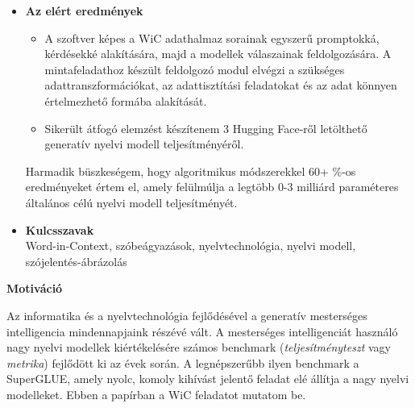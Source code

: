 \documentclass[12pt]{report}
\theoremstyle{definition}
\begin{document}
\begin{itemize}
\begin{itemize}
      \end{itemize}
\item \textbf{Az elért eredmények}
        \\
        \begin{itemize}
            \item A szoftver képes a WiC adathalmaz sorainak egyszerű promptokká, kérdésekké alakítására, majd a modellek válaszainak feldolgozására.
        A mintafeladathoz készült feldolgozó modul elvégzi a szükséges adattranszformációkat, az adattisztítási feladatokat és az adat könnyen értelmezhető formába alakítását.

     \item Sikerült átfogó elemzést készítenem 3 Hugging Face-ről
      letölthető generatív nyelvi modell teljesítményéről.
        \end{itemize}


      Harmadik büszkeségem, hogy algoritmikus módszerekkel 60+ \%-os eredményeket értem el, amely felülmúlja a legtöbb 0-3 milliárd paraméteres általános célú nyelvi modell teljesítményét.

\item \textbf{Kulcsszavak}
        \\
       Word-in-Context, szóbeágyazások, nyelvtechnológia, nyelvi modell, szójelentés-ábrázolás
\end{itemize}

\tableofcontents

\clearpage

{\Large\bf Motiváció }

Az informatika és a nyelvtechnológia fejlődésével a generatív mesterséges intelligencia mindennapjaink részévé vált. A mesterséges intelligenciát használó nagy nyelvi modellek kiértékelésére számos benchmark (\textit{teljesítményteszt} vagy \textit{metrika}) fejlődött ki az évek során. A legnépszerűbb ilyen benchmark a
SuperGLUE, amely nyolc, komoly kihívást jelentő feladat elé állítja a nagy nyelvi modelleket. Ebben a papírban a WiC feladatot mutatom be.
\end{document}
